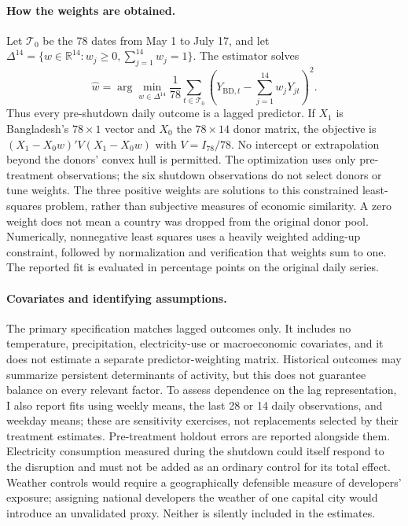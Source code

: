 \paragraph{How the weights are obtained.} Let $\mathcal T_0$ be the 78 dates from May 1 to July 17, and let $\Delta^{14}=\{w\in\mathbb R^{14}:w_j\geq0,\sum_{j=1}^{14}w_j=1\}$. The estimator solves
\begin{equation}
 \widehat w=\arg\min_{w\in\Delta^{14}}\frac{1}{78}\sum_{t\in\mathcal T_0}
 \left(Y_{\mathrm{BD},t}-\sum_{j=1}^{14}w_jY_{jt}\right)^2.
 \label{eq:sc_minimization}
\end{equation}
Thus every pre-shutdown daily outcome is a lagged predictor. If $X_1$ is Bangladesh's $78\times1$ vector and $X_0$ the $78\times14$ donor matrix, the objective is $(X_1-X_0w)'V(X_1-X_0w)$ with $V=I_{78}/78$. No intercept or extrapolation beyond the donors' convex hull is permitted. The optimization uses only pre-treatment observations; the six shutdown observations do not select donors or tune weights. The three positive weights are solutions to this constrained least-squares problem, rather than subjective measures of economic similarity. A zero weight does not mean a country was dropped from the original donor pool. Numerically, nonnegative least squares uses a heavily weighted adding-up constraint, followed by normalization and verification that weights sum to one. The reported fit is evaluated in percentage points on the original daily series.

\paragraph{Covariates and identifying assumptions.} The primary specification matches lagged outcomes only. It includes no temperature, precipitation, electricity-use or macroeconomic covariates, and it does not estimate a separate predictor-weighting matrix. Historical outcomes may summarize persistent determinants of activity, but this does not guarantee balance on every relevant factor. To assess dependence on the lag representation, I also report fits using weekly means, the last 28 or 14 daily observations, and weekday means; these are sensitivity exercises, not replacements selected by their treatment estimates. Pre-treatment holdout errors are reported alongside them. Electricity consumption measured during the shutdown could itself respond to the disruption and must not be added as an ordinary control for its total effect. Weather controls would require a geographically defensible measure of developers' exposure; assigning national developers the weather of one capital city would introduce an unvalidated proxy. Neither is silently included in the estimates.


